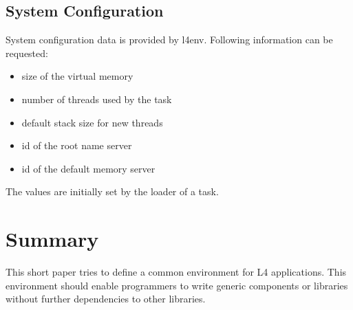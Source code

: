 \documentclass[twocolumn,10pt]{article}
\begin{document}
\subsection{System Configuration}

System configuration data is provided by l4env. Following information
can be requested:
\begin{itemize}
\item size of the virtual memory
\item number of threads used by the task
\item default stack size for new threads
\item id of the root name server
\item id of the default memory server
\end{itemize}
The values are initially set by the loader of a task.
 
\section{Summary}

This short paper tries to define a common environment for L4
applications. This environment should enable programmers to write
generic components or libraries without further dependencies to other
libraries.

%
%
%
%
\end{document}
